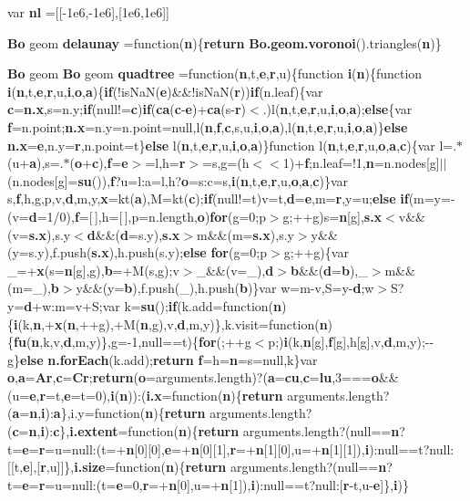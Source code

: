 \begin{DoxyCompactItemize}
\item 
var {\bf nl} =[[-\/1e6,-\/1e6],[1e6,1e6]]
\item 
{\bf Bo} geom {\bf delaunay} =function({\bf n})\{{\bf return} {\bf Bo.\+geom.\+voronoi}().triangles({\bf n})\}
\item 
{\bf Bo} geom {\bf Bo} geom {\bf quadtree} =function({\bf n},t,{\bf e},{\bf r},u)\{function {\bf i}({\bf n})\{function {\bf i}({\bf n},t,{\bf e},{\bf r},u,{\bf i},{\bf o},{\bf a})\{{\bf if}(!is\+Na\+N({\bf e})\&\&!is\+Na\+N({\bf r})){\bf if}(n.\+leaf)\{var {\bf c}={\bf n.\+x},s=n.\+y;{\bf if}(null!={\bf c}){\bf if}({\bf ca}({\bf c}-\/{\bf e})+{\bf ca}(s-\/{\bf r})$<$.)l({\bf n},t,{\bf e},{\bf r},u,{\bf i},{\bf o},{\bf a});{\bf else}\{var {\bf f}=n.\+point;{\bf n.\+x}=n.\+y=n.\+point=null,l({\bf n},{\bf f},{\bf c},s,u,{\bf i},{\bf o},{\bf a}),l({\bf n},t,{\bf e},{\bf r},u,{\bf i},{\bf o},{\bf a})\}{\bf else} {\bf n.\+x}={\bf e},n.\+y={\bf r},n.\+point=t\}{\bf else} l({\bf n},t,{\bf e},{\bf r},u,{\bf i},{\bf o},{\bf a})\}function l({\bf n},t,{\bf e},{\bf r},u,{\bf o},{\bf a},{\bf c})\{var l=.$\ast$(u+{\bf a}),s=.$\ast$({\bf o}+{\bf c}),{\bf f}={\bf e}$>$=l,h={\bf r}$>$=s,g=(h$<$$<$1)+{\bf f};n.\+leaf=!1,{\bf n}=n.\+nodes[g]$\vert$$\vert$(n.\+nodes[g]={\bf su}()),{\bf f}?u=l\+:a=l,h?{\bf o}=s\+:c=s,{\bf i}({\bf n},t,{\bf e},{\bf r},u,{\bf o},{\bf a},{\bf c})\}var s,{\bf f},h,g,p,v,{\bf d},m,y,{\bf x}=kt({\bf a}),M=kt({\bf c});{\bf if}(null!=t)v=t,{\bf d}={\bf e},m={\bf r},y=u;{\bf else} {\bf if}(m=y=-\/(v={\bf d}=1/0),{\bf f}=[$\,$],h=[$\,$],p=n.\+length,{\bf o}){\bf for}(g=0;p$>$g;++g)s={\bf n}[g],{\bf s.\+x}$<$v\&\&(v={\bf s.\+x}),s.\+y$<${\bf d}\&\&({\bf d}=s.\+y),{\bf s.\+x}$>$m\&\&(m={\bf s.\+x}),s.\+y$>$y\&\&(y=s.\+y),f.\+push({\bf s.\+x}),h.\+push(s.\+y);{\bf else} {\bf for}(g=0;p$>$g;++g)\{var \+\_\+=+{\bf x}(s={\bf n}[g],g),{\bf b}=+M(s,g);v$>$\+\_\+\&\&(v=\+\_\+),{\bf d}$>${\bf b}\&\&({\bf d}={\bf b}),\+\_\+$>$m\&\&(m=\+\_\+),{\bf b}$>$y\&\&(y={\bf b}),f.\+push(\+\_\+),h.\+push({\bf b})\}var w=m-\/v,S=y-\/{\bf d};w$>$S?y={\bf d}+w\+:m=v+S;var k={\bf su}();{\bf if}(k.\+add=function({\bf n})\{{\bf i}(k,{\bf n},+{\bf x}({\bf n},++g),+M({\bf n},g),v,{\bf d},m,y)\},k.\+visit=function({\bf n})\{{\bf fu}({\bf n},k,v,{\bf d},m,y)\},g=-\/1,null==t)\{{\bf for}(;++g$<$p;){\bf i}(k,{\bf n}[g],{\bf f}[g],h[g],v,{\bf d},m,y);-\/-\/g\}{\bf else} {\bf n.\+for\+Each}(k.\+add);{\bf return} {\bf f}=h={\bf n}=s=null,k\}var {\bf o},{\bf a}={\bf Ar},{\bf c}={\bf Cr};{\bf return}({\bf o}=arguments.\+length)?({\bf a}={\bf cu},{\bf c}={\bf lu},3==={\bf o}\&\&(u={\bf e},{\bf r}=t,{\bf e}=t=0),{\bf i}({\bf n}))\+:({\bf i.\+x}=function({\bf n})\{{\bf return} arguments.\+length?({\bf a}={\bf n},{\bf i})\+:{\bf a}\},i.\+y=function({\bf n})\{{\bf return} arguments.\+length?({\bf c}={\bf n},{\bf i})\+:{\bf c}\},{\bf i.\+extent}=function({\bf n})\{{\bf return} arguments.\+length?(null=={\bf n}?t={\bf e}={\bf r}=u=null\+:(t=+{\bf n}[0][0],{\bf e}=+{\bf n}[0][1],{\bf r}=+{\bf n}[1][0],u=+{\bf n}[1][1]),{\bf i})\+:null==t?null\+:[[t,{\bf e}],[{\bf r},u]]\},{\bf i.\+size}=function({\bf n})\{{\bf return} arguments.\+length?(null=={\bf n}?t={\bf e}={\bf r}=u=null\+:(t={\bf e}=0,{\bf r}=+{\bf n}[0],u=+{\bf n}[1]),{\bf i})\+:null==t?null\+:[{\bf r}-\/t,u-\/{\bf e}]\},{\bf i})\}

\end{DoxyCompactItemize}
